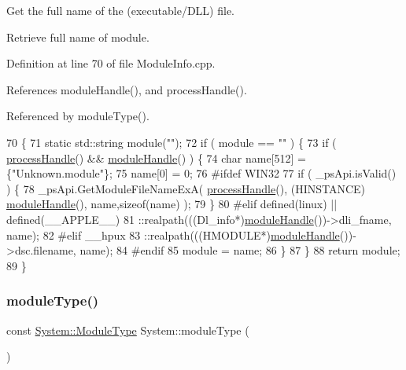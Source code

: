 Get the full name of the (executable/\+D\+LL) file. 

Retrieve full name of module. 

Definition at line 70 of file Module\+Info.\+cpp.



References module\+Handle(), and process\+Handle().



Referenced by module\+Type().


\begin{DoxyCode}
70                                           \{
71   \textcolor{keyword}{static} std::string module(\textcolor{stringliteral}{""});
72   \textcolor{keywordflow}{if} ( module == \textcolor{stringliteral}{""} )   \{
73     \textcolor{keywordflow}{if} ( \hyperlink{namespaceSystem_a563f947d4a2921f4348ff4f8e909a9f2}{processHandle}() && \hyperlink{namespaceSystem_ab88d0de1d6850b6f95522e9c242eeab0}{moduleHandle}() )    \{
74       \textcolor{keywordtype}{char} name[512] = \{\textcolor{stringliteral}{"Unknown.module"}\};
75       name[0] = 0;
76 \textcolor{preprocessor}{#ifdef WIN32}
77       \textcolor{keywordflow}{if} ( \_psApi.isValid() )   \{
78         \_psApi.GetModuleFileNameExA( \hyperlink{namespaceSystem_a563f947d4a2921f4348ff4f8e909a9f2}{processHandle}(), (HINSTANCE)
      \hyperlink{namespaceSystem_ab88d0de1d6850b6f95522e9c242eeab0}{moduleHandle}(), name,\textcolor{keyword}{sizeof}(name) );
79       \}
80 \textcolor{preprocessor}{#elif defined(linux) || defined(\_\_APPLE\_\_)}
81       ::realpath(((Dl\_info*)\hyperlink{namespaceSystem_ab88d0de1d6850b6f95522e9c242eeab0}{moduleHandle}())->dli\_fname, name);
82 \textcolor{preprocessor}{#elif \_\_hpux}
83       ::realpath(((HMODULE*)\hyperlink{namespaceSystem_ab88d0de1d6850b6f95522e9c242eeab0}{moduleHandle}())->dsc.filename, name);
84 \textcolor{preprocessor}{#endif}
85       module = name;
86     \}
87   \}
88   \textcolor{keywordflow}{return} module;
89 \}
\end{DoxyCode}
\mbox{\label{namespaceSystem_aa0cb1193baa6883c2686a0a87d56d228}} 
\subsubsection{\texorpdfstring{module\+Type()}{moduleType()}}
{\footnotesize\ttfamily const \hyperlink{namespaceSystem_a12d36cf455e22c1e75ef65a2105df4c5}{System\+::\+Module\+Type} System\+::module\+Type (\begin{DoxyParamCaption}{ }\end{DoxyParamCaption})}



